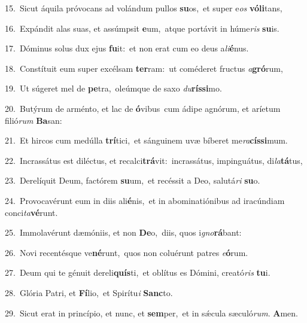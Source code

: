 {\numbfont\textcolor{\numbcolor}{15.}}~Sicut áquila próvocans ad volándum pullos \textbf{su}\-os,~\star et super e\textit{os} \textbf{vó}\-\textbf{li}tans,\par
{\numbfont\textcolor{\numbcolor}{16.}}~Expándit alas suas, et assúmpsit \textbf{e}\-um,~\star atque portávit in húme\textit{ris} \textbf{su}\-is.\par
{\numbfont\textcolor{\numbcolor}{17.}}~Dóminus solus dux ejus \textbf{fu}\-it:~\star et non erat cum eo deus a\-\textit{li}\-\textbf{é}nus.\par
{\numbfont\textcolor{\numbcolor}{18.}}~Constítuit eum super excélsam \textbf{ter}\-ram:~\star ut coméderet fructus \textit{a}\-\textbf{gró}rum,\par
{\numbfont\textcolor{\numbcolor}{19.}}~Ut súgeret mel de \textbf{pe}\-tra,~\star oleúmque de saxo \textit{du}\-\textbf{rís}\textbf{si}mo.\par
{\numbfont\textcolor{\numbcolor}{20.}}~Butýrum de arménto, et lac de \textbf{ó}\-vibus~\star cum ádipe agnórum, et aríetum filió\textit{rum} \textbf{Ba}\-san:\par
{\numbfont\textcolor{\numbcolor}{21.}}~Et hircos cum medúlla \textbf{trí}\-tici,~\star et sánguinem uvæ bíberet me\-\textit{ra}\-\textbf{cís}\textbf{si}mum.\par
{\numbfont\textcolor{\numbcolor}{22.}}~Incrassátus est diléctus, et recalci\-\textbf{trá}\-vit:~\star incrassátus, impinguátus, di\-\textit{la}\-\textbf{tá}tus,\par
{\numbfont\textcolor{\numbcolor}{23.}}~Derelíquit Deum, factórem \textbf{su}\-um,~\star et recéssit a Deo, salutá\textit{ri} \textbf{su}\-o.\par
{\numbfont\textcolor{\numbcolor}{24.}}~Provocavérunt eum in diis ali\-\textbf{é}\-nis,~\star et in abominatiónibus ad iracúndiam conci\-\textit{ta}\-\textbf{vé}runt.\par
{\numbfont\textcolor{\numbcolor}{25.}}~Immolavérunt dæmóniis, et non \textbf{De}\-o,~\star diis, quos i\-\textit{gno}\-\textbf{rá}bant:\par
{\numbfont\textcolor{\numbcolor}{26.}}~Novi recentésque ve\-\textbf{né}\-runt,~\star quos non coluérunt patres \textit{e}\-\textbf{ó}rum.\par
{\numbfont\textcolor{\numbcolor}{27.}}~Deum qui te génuit dereli\-\textbf{quís}\-ti,~\star et oblítus es Dómini, creató\textit{ris} \textbf{tu}\-i.\par
{\numbfont\textcolor{\numbcolor}{28.}}~Glória Patri, et \textbf{Fí}\-lio,~\star et Spirítu\textit{i} \textbf{Sanc}\-to.\par
{\numbfont\textcolor{\numbcolor}{29.}}~Sicut erat in princípio, et nunc, et \textbf{sem}\-per,~\star et in sǽcula sæculó\-\textit{rum}\-. \textbf{A}\-men.\par
